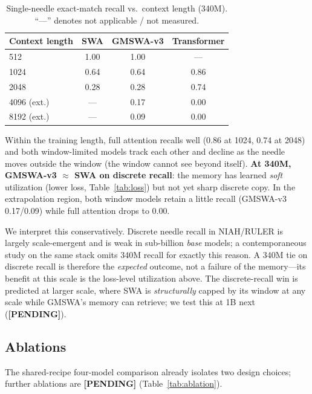 \documentclass[letterpaper]{article} %
\newcommand{\pending}{\textbf{[PENDING]}}
\begin{document}
\begin{table}[t]
\centering
\caption{Single-needle exact-match recall vs.\ context length (340M). ``---'' denotes not applicable / not measured.}
\label{tab:niah}
\begin{tabular}{lccc}
\toprule
Context length & SWA & GMSWA-v3 & Transformer \\
\midrule
512         & 1.00 & 1.00 & --- \\
1024        & 0.64 & 0.64 & 0.86 \\
2048        & 0.28 & 0.28 & 0.74 \\
4096 (ext.) & ---  & 0.17 & 0.00 \\
8192 (ext.) & ---  & 0.09 & 0.00 \\
\bottomrule
\end{tabular}
\end{table}

Within the training length, full attention recalls well (0.86 at 1024, 0.74 at 2048) and both window-limited models track each other and decline as the needle moves outside the window (the window cannot see beyond itself). \textbf{At 340M, GMSWA-v3 $\approx$ SWA on discrete recall}: the memory has learned \emph{soft} utilization (lower loss, Table~\ref{tab:loss}) but not yet sharp discrete copy. In the extrapolation region, both window models retain a little recall (GMSWA-v3 0.17/0.09) while full attention drops to 0.00.

We interpret this conservatively. Discrete needle recall in NIAH/RULER is largely scale-emergent and is weak in sub-billion \emph{base} models; a contemporaneous study on the same stack \citep{recallscale2025} omits 340M recall for exactly this reason. A 340M tie on discrete recall is therefore the \emph{expected} outcome, not a failure of the memory---its benefit at this scale is the loss-level utilization above. The discrete-recall win is predicted at larger scale, where SWA is \emph{structurally} capped by its window at any scale while GMSWA's memory can retrieve; we test this at 1B next (\pending{}).

\subsection{Ablations}
The shared-recipe four-model comparison already isolates two design choices; further ablations are \pending{} (Table~\ref{tab:ablation}).
\end{document}
